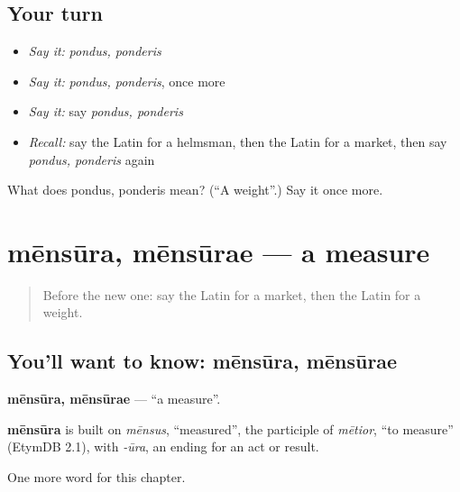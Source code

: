\subsection*{Your turn}
\begin{itemize}
\raggedright
  \item \emph{Say it:} \emph{pondus, ponderis}
  \item \emph{Say it:} \emph{pondus, ponderis}, once more
  \item \emph{Say it:} say \emph{pondus, ponderis}
  \item \emph{Recall:} say the Latin for a helmsman, then the Latin for a market, then say \emph{pondus, ponderis} again
\end{itemize}

\begin{tcolorbox}[breakable,colback=teal!4,colframe=teal!35!black,title={Before you move on}]
What does pondus, ponderis mean? (\textquotedblleft{}A weight\textquotedblright{}.) Say it once more.
\end{tcolorbox}
\section[mēnsūra, mēnsūrae]{mēnsūra, mēnsūrae — a measure}

\label{lesson:LA-C186-mensura}



\begin{quote}
Before the new one: say the Latin for a market, then the Latin for a weight.
\end{quote}

\subsection*{You'll want to know: mēnsūra, mēnsūrae}
\textbf{mēnsūra, mēnsūrae} — \textquotedblleft{}a measure\textquotedblright{}.

\begin{cousinweb}
\textbf{mēnsūra} is built on \emph{mēnsus}, \textquotedblleft{}measured\textquotedblright{}, the participle of \emph{mētior}, \textquotedblleft{}to measure\textquotedblright{} (EtymDB 2.1), with \emph{-ūra}, an ending for an act or result.
\end{cousinweb}

\begin{grammarlens}[title={What you've built}]
One more word for this chapter.
\end{grammarlens}

